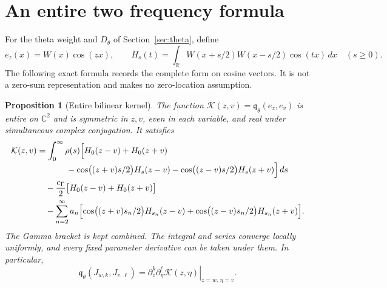 \documentclass[11pt]{article}
\newtheorem{proposition}[theorem]{Proposition}
\theoremstyle{definition}
\theoremstyle{remark}
\newcommand{\R}{\mathbb R}
\newcommand{\C}{\mathbb C}
\newcommand{\qth}{\mathfrak q_\theta}
\newcommand{\dd}{\,dx}
\begin{document}
\appendix
\section{An entire two frequency formula}\label{sec:kernel}

For the theta weight and $D_\theta$ of Section~\ref{sec:theta}, define
\begin{equation}\label{eq:overlap}
 e_z(x)=W(x)\cos(zx),\qquad
 H_s(t)=\int_\R W(x+s/2)W(x-s/2)\cos(tx)\dd\quad(s\ge0).
\end{equation}
The following exact formula records the complete form on cosine vectors.
It is not a zero-sum representation and makes no zero-location assumption.

\begin{proposition}[Entire bilinear kernel]\label{prop:kernel}
The function
$\mathcal K(z,v)=\qth(e_z,e_{\overline v})$ is entire on $\C^2$ and is
symmetric in $z,v$, even in each variable, and real under simultaneous
complex conjugation. It satisfies
\begin{align}\label{eq:kernel}
 \mathcal K(z,v)
 &=\int_0^\infty\rho(s)\Bigl[
 H_0(z-v)+H_0(z+v)\notag\\[-2pt]
 &\hspace{3.5em}-\cos\bigl((z+v)s/2\bigr)H_s(z-v)
 -\cos\bigl((z-v)s/2\bigr)H_s(z+v)\Bigr]\,ds\notag\\
 &\quad-\frac{c_\Gamma}{2}\bigl[H_0(z-v)+H_0(z+v)\bigr]\notag\\
 &\quad-\sum_{n=2}^\infty a_n\Bigl[
 \cos\bigl((z+v)s_n/2\bigr)H_{s_n}(z-v)
 +\cos\bigl((z-v)s_n/2\bigr)H_{s_n}(z+v)\Bigr].
\end{align}
The Gamma bracket is kept combined. The integral and series converge
locally uniformly, and every fixed parameter derivative can be taken under
them. In particular,
\begin{equation}\label{eq:jet-matrix}
 \qth(J_{w,k},J_{v,\ell})
 =\left.\partial_z^k\partial_\eta^\ell\mathcal K(z,\eta)
 \right|_{z=w,\,\eta=\overline v}.
\end{equation}
\end{proposition}
\end{document}
